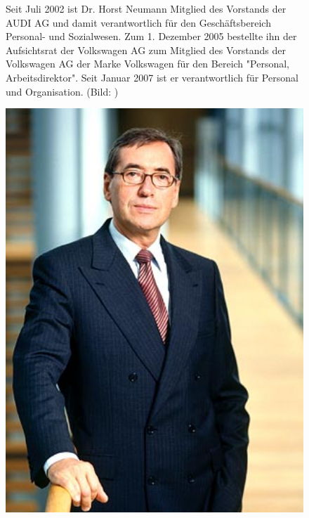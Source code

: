 \documentclass[12pt]{article}
\begin{document}
\begin{figure}[!h]
	\centering
	\begin{minipage}[h]{0.65\textwidth}
		Seit Juli 2002 ist Dr. Horst Neumann Mitglied des Vorstands der AUDI AG und damit verantwortlich für den Geschäftsbereich Personal- und Sozialwesen. Zum 1. Dezember 2005 bestellte ihn der Aufsichtsrat der Volkswagen AG zum Mitglied des Vorstands der Volkswagen AG  der Marke Volkswagen für den Bereich "Personal, Arbeitsdirektor". Seit Januar 2007 ist er verantwortlich für Personal und Organisation. (Bild: \cite{hmpic} )
	\end{minipage}
	\begin{minipage}[h]{0.10\textwidth}
		\hspace{1cm} 
	\end{minipage}
	\begin{minipage}[h]{0.20\textwidth}
		\centering
		\includegraphics[width=1.0\textwidth]{images/HorstNeumann.jpg}
		\label{fig:vorstandvw5}
	\end{minipage}
\end{figure}
\end{document}
